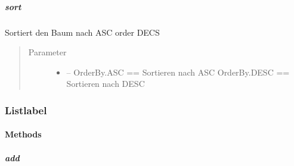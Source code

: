 \documentclass[letterpaper,10pt,ngerman]{sphinxmanual}
\begin{document}
\subparagraph{sort}
\label{\detokenize{com/linuxluigi/edu/list/BinaryLinkedList:sort}}

\begin{fulllineitems}
\label{\detokenize{com/linuxluigi/edu/list/BinaryLinkedList:com.linuxluigi.edu.list.BinaryLinkedList.sort(OrderBy)}}
Sortiert den Baum nach ASC order DECS
\begin{quote}\begin{description}
\item[{Parameter}] \leavevmode\begin{itemize}
\item {} 
 -- OrderBy.ASC == Sortieren nach ASC OrderBy.DESC == Sortieren nach DESC

\end{itemize}

\end{description}\end{quote}

\end{fulllineitems}



\subsubsection{Listlabel}
\label{\detokenize{com/linuxluigi/edu/list/Listlabel::doc}}\label{\detokenize{com/linuxluigi/edu/list/Listlabel:listlabel}}

\begin{fulllineitems}
\label{\detokenize{com/linuxluigi/edu/list/Listlabel:com.linuxluigi.edu.list.Listlabel}}
\end{fulllineitems}



\paragraph{Methods}
\label{\detokenize{com/linuxluigi/edu/list/Listlabel:methods}}

\subparagraph{add}
\label{\detokenize{com/linuxluigi/edu/list/Listlabel:add}}
\end{document}
